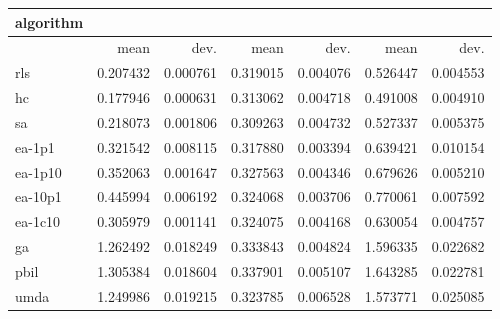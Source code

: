 \begin{tabular}{@{}l*{6}{>{{}}N{1}{2}}@{}}
\toprule
{algorithm} &  &  &  \\
\midrule
& {mean} & {dev.} & {mean} & {dev.} & {mean} & {dev.} \\
\midrule
rls & 0.207432 & 0.000761 & 0.319015 & 0.004076 & 0.526447 & 0.004553 \\
 hc & 0.177946 & 0.000631 & 0.313062 & 0.004718 & 0.491008 & 0.004910 \\
 sa & 0.218073 & 0.001806 & 0.309263 & 0.004732 & 0.527337 & 0.005375 \\
 ea-1p1 & 0.321542 & 0.008115 & 0.317880 & 0.003394 & 0.639421 & 0.010154 \\
 ea-1p10 & 0.352063 & 0.001647 & 0.327563 & 0.004346 & 0.679626 & 0.005210 \\
 ea-10p1 & 0.445994 & 0.006192 & 0.324068 & 0.003706 & 0.770061 & 0.007592 \\
 ea-1c10 & 0.305979 & 0.001141 & 0.324075 & 0.004168 & 0.630054 & 0.004757 \\
 ga & 1.262492 & 0.018249 & 0.333843 & 0.004824 & 1.596335 & 0.022682 \\
 pbil & 1.305384 & 0.018604 & 0.337901 & 0.005107 & 1.643285 & 0.022781 \\
 umda & 1.249986 & 0.019215 & 0.323785 & 0.006528 & 1.573771 & 0.025085 \\
 \bottomrule
\end{tabular}
